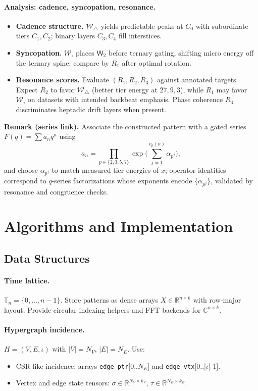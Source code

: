 \documentclass[12pt]{article}
\numberwithin{equation}{section}
\theoremstyle{plain}
\theoremstyle{definition}
\theoremstyle{remark}
\begin{document}
\paragraph{Analysis: cadence, syncopation, resonance.}
\begin{itemize}
  \item \textbf{Cadence structure.} $\mathcal{W}_{\triangle}$ yields predictable peaks at $C_0$ with subordinate tiers $C_1,C_2$; binary layers $C_3,C_4$ fill interstices.
  \item \textbf{Syncopation.} $\mathcal{W}_{\square}$ places $\mathsf{W}_2$ before ternary gating, shifting micro energy off the ternary spine; compare by $R_1$ after optimal rotation.
  \item \textbf{Resonance scores.} Evaluate $(R_1,R_2,R_3)$ against annotated targets. Expect $R_2$ to favor $\mathcal{W}_{\triangle}$ (better tier energy at $27,9,3$), while $R_1$ may favor $\mathcal{W}_{\square}$ on datasets with intended backbeat emphasis. Phase coherence $R_3$ discriminates heptadic drift layers when present.
\end{itemize}

\medskip
\noindent\textbf{Remark (series link).}
Associate the constructed pattern with a gated series $F(q)=\sum a_n q^n$ using
\[
a_n=\prod_{p\in\{2,3,5,7\}} \exp\!\Big(\sum_{j=1}^{v_p(n)}\alpha_{p^j}\Big),
\]
and choose $\alpha_{p^j}$ to match measured tier energies of $x$; operator identities correspond to $q$-series factorizations whose exponents encode $\{\alpha_{p^j}\}$, validated by resonance and congruence checks.

\section*{Algorithms and Implementation}

\subsection*{Data Structures}
\paragraph{Time lattice.}
\(\mathbb{T}_n=\{0,\dots,n-1\}\). Store patterns as dense arrays \(X\in\mathbb{R}^{n\times k}\) with row-major layout. Provide circular indexing helpers and FFT backends for \(\mathbb{C}^{n\times k}\).

\paragraph{Hypergraph incidence.}
\(H=(V,E,\iota)\) with \(|V|=N_V\), \(|E|=N_E\). Use:
\begin{itemize}
  \item CSR-like incidence: arrays \texttt{edge\_ptr}[0..\(N_E\)] and \texttt{edge\_vtx}[0..|\(\iota\)|-1].
  \item Vertex and edge state tensors: \(\sigma\in\mathbb{R}^{N_V\times k_V}\), \(\tau\in\mathbb{R}^{N_E\times k_E}\).
\end{itemize}
\end{document}
